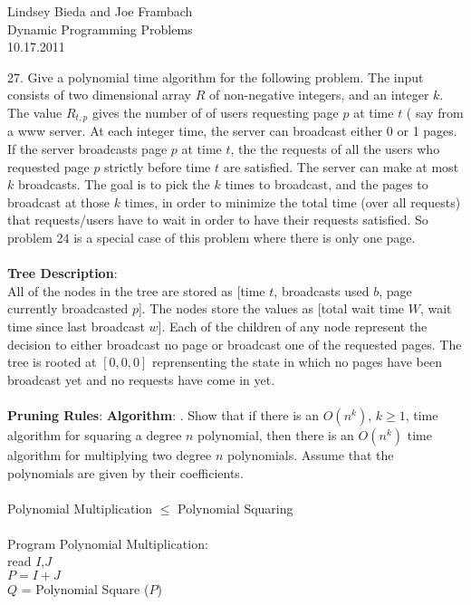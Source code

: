 \documentclass[10pt]{article}
\newcommand{\tab}{\hspace*{2em}}
\begin{document}
	\begin{flushright}
	Lindsey Bieda and Joe Frambach\\
	Dynamic Programming Problems\\
	10.17.2011
	\end{flushright}
		27.	Give a polynomial time algorithm for the following problem. The input consists of two dimensional
		array $R$ of non-negative integers, and an integer $k$. The value $R_{t,p}$ gives the number of of users
		requesting page $p$ at time $t$ ( say from a www server. At each integer time, the server can broadcast
		either 0 or 1 pages. If the server broadcasts page $p$ at time $t$, the the requests of all the users who
		requested page $p$ strictly before time $t$ are satisfied. The server can make at most $k$ broadcasts. The
		goal is to pick the $k$ times to broadcast, and the pages to broadcast at those $k$ times, in order to
		minimize the total time (over all requests) that requests/users have to wait in order to have their
		requests satisfied. So problem 24 is a special case of this problem where there is only one page.\\
		\\
		\textbf{Tree Description}:\\
		All of the nodes in the tree are stored as [time $t$, broadcasts used $b$, page currently broadcasted $p$]. 
		The nodes store the values as [total wait time $W$, wait time since last broadcast $w$]. Each of the children
		of any node represent the decision to either broadcast no page or broadcast one of the requested pages.
		The tree is rooted at $[0,0,0]$ reprensenting the state in which no pages have been broadcast yet and no
		requests have come in yet.\\
		\\
		\textbf{Pruning Rules}:
		\textbf{Algorithm}:
		. Show that if there is an $O(n^k)$, $k \geq 1$, time algorithm for squaring a degree $n$ polynomial,
		then there is an $O(n^k)$ time algorithm for multiplying two degree $n$ polynomials. Assume that the polynomials
		are given by their coefficients.\\
		\\
		Polynomial Multiplication $\leq$ Polynomial Squaring\\
		\\
		Program Polynomial Multiplication:\\
		\tab read $I$,$J$\\
		\tab $P = I + J$\\
		\tab $Q$ = Polynomial Square ($P$)\\
\end{document}
